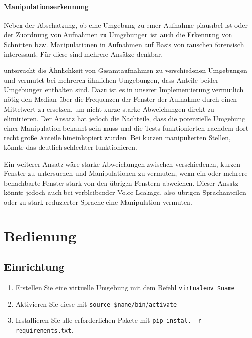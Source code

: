 \documentclass[
	fontsize=10.5pt,
	marginpar=false,
	ngerman,
	accentcolor=3d
	]{tudapub}
\begin{document}
\paragraph{Manipulationserkennung}
\label{manipulationdet}

Neben der Abschätzung, ob eine Umgebung zu einer Aufnahme plausibel ist oder der Zuordnung von Aufnahmen zu Umgebungen ist auch die Erkennung von Schnitten bzw. Manipulationen in Aufnahmen auf Basis von rauschen forensisch interessant. Für diese sind mehrere Ansätze denkbar.

\cite{ikram_digital_2010} untersucht die Ähnlichkeit von Gesamtaufnahmen zu verschiedenen Umgebungen und vermutet bei mehreren ähnlichen Umgebungen, dass Anteile beider Umgebungen enthalten sind. Dazu ist es in unserer Implementierung vermutlich nötig den Median über die Frequenzen der Fenster der Aufnahme durch einen Mittelwert zu ersetzen, um nicht kurze starke Abweichungen direkt zu eliminieren. Der Ansatz hat jedoch die Nachteile, dass die potenzielle Umgebung einer Manipulation bekannt sein muss und die Tests funktionierten nachdem dort recht große Anteile hineinkopiert wurden. Bei kurzen manipulierten Stellen, könnte das deutlich schlechter funktionieren.

Ein weiterer Ansatz wäre starke Abweichungen zwischen verschiedenen, kurzen Fenster zu untersuchen und Manipulationen zu vermuten, wenn ein oder mehrere benachbarte Fenster stark von den übrigen Fenstern abweichen. Dieser Ansatz könnte jedoch auch bei verbleibender Voice Leakage, also übrigen Sprachanteilen oder zu stark reduzierter Sprache eine Manipulation vermuten.

\pagebreak

\section{Bedienung}
\label{usage}


\subsection{Einrichtung}

\begin{enumerate}
	\item Erstellen Sie eine virtuelle Umgebung mit dem Befehl \texttt{virtualenv \$name}
	\item Aktivieren Sie diese mit \texttt{source \$name/bin/activate}
	\item Installieren Sie alle erforderlichen Pakete mit \texttt{pip install -r requirements.txt}.
\end{enumerate}
\end{document}
